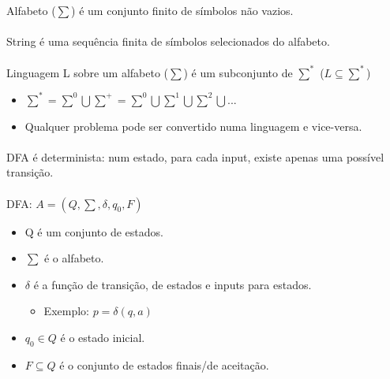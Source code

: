 \documentclass[../resumosTCOM.tex]{subfiles}
\begin{document}
 

Alfabeto (\(\sum\)) é um conjunto finito de símbolos não vazios.

\paragraph{}

String é uma sequência finita de símbolos selecionados do alfabeto.

\paragraph{}

Linguagem L sobre um alfabeto (\(\sum\)) é um subconjunto de \(\sum^*\) (\(L \subseteq  \sum^*\))
\begin{itemize}
    \item \(\sum^* = \sum^0 \bigcup \sum^+ = \sum^0 \bigcup \sum^1 \bigcup \sum^2 \bigcup ... \)
    \item Qualquer problema pode ser convertido numa linguagem e vice-versa.
\end{itemize}

\paragraph{}

DFA é determinista: num estado, para cada input, existe apenas uma possível transição.

\paragraph{}

DFA: \(A = (Q, \sum, \delta, q_0, F)\)
\begin{itemize}
    \item Q é um conjunto de estados.
    \item \(\sum\) é o alfabeto.
    \item \(\delta\) é a função de transição, de estados e inputs para estados.
    \begin{itemize}
        \item Exemplo: \(p = \delta(q, a)\)
    \end{itemize}
    \item \(q_0 \in Q\) é o estado inicial.
    \item \(F \subseteq Q\) é o conjunto de estados finais/de aceitação.
\end{itemize}
\end{document}
